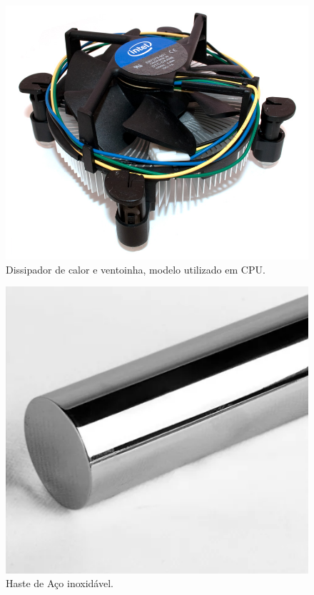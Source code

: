 \begin{figure}[h]
    \centering
    \includegraphics[scale=0.20]{figuras/projeto/controle/cooler.png}
    \caption{Dissipador de calor e ventoinha, modelo utilizado em CPU.}
    \label{fig:cooler}
\end{figure}


\begin{figure}[h]
    \centering
    \includegraphics[scale=0.30]{figuras/projeto/controle/haste.png}
    \caption{Haste de Aço inoxidável.}
    \label{fig:haste_inox}
\end{figure}

